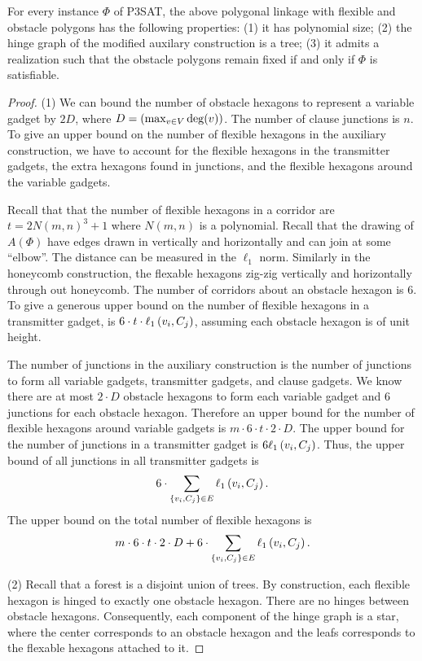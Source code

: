 \begin{lem}\label{lem:aux}
For every instance $\Phi$ of P3SAT, the above polygonal linkage with flexible and obstacle polygons has the following properties: (1) it has polynomial size; (2) the hinge graph of the modified auxilary construction is a tree;
(3) it admits a realization such that the obstacle polygons remain fixed if and only if $\Phi$ is satisfiable.
\end{lem}

\begin{proof}
\noindent (1) We can bound the number of obstacle hexagons to represent a variable gadget by $2 D$, where $D = \left(  \max_{v \in V} \deg (v) \right)$.  
The number of clause junctions is $n$.
To give an upper bound on the number of flexible hexagons in the auxiliary construction, we have to account for the flexible hexagons in the transmitter gadgets, the extra hexagons found in junctions, and the flexible hexagons around the variable gadgets.

Recall that that the number of flexible hexagons in a corridor are $ t = 2N(m,n)^3 + 1 $ where $N(m,n)$ is a polynomial. 
Recall that the drawing of $A(\Phi)$ have edges drawn in vertically and horizontally and can join at some ``elbow''.  
The distance can be measured in the $\ell_1$ norm.
Similarly in the honeycomb construction, the flexable hexagons zig-zig vertically and horizontally through out honeycomb.  
The number of corridors about an obstacle hexagon is $6$.
To give a generous upper bound on the number of flexible hexagons in a transmitter gadget, is $6 \cdot t \cdot \ell_1\left( v_i,C_j \right)$, assuming each obstacle hexagon is of unit height.

The number of junctions in the auxiliary construction is the number of junctions to form all variable gadgets, transmitter gadgets, and clause gadgets. 
We know there are at most $2 \cdot D$ obstacle hexagons to form each variable gadget and $6$ junctions for each obstacle hexagon.  
Therefore an upper bound for the number of flexible hexagons around variable gadgets is $m \cdot 6 \cdot t \cdot 2 \cdot D$.
The upper bound for the number of junctions in a transmitter gadget is $6 \ell_1 \left( v_i, C_j \right)$.  
Thus, the upper bound of all junctions in all transmitter gadgets is $$6 \cdot \sum_{\left\lbrace v_i, C_j \right\rbrace \in E} \ell_1 \left( v_i, C_j \right).$$
The upper bound on the total number of flexible hexagons is
$$m \cdot 6 \cdot t \cdot 2 \cdot D + 6 \cdot \sum_{\left\lbrace v_i, C_j \right\rbrace \in E} \ell_1 \left( v_i, C_j \right).$$

\noindent (2) Recall that a forest is a disjoint union of trees. 
By construction, each flexible hexagon is hinged to exactly one obstacle hexagon.  
There are no hinges between obstacle hexagons.
Consequently, each component of the hinge graph is a star, where the center corresponds to an obstacle hexagon and the leafs corresponds to the flexable hexagons attached to it.
\end{proof}



